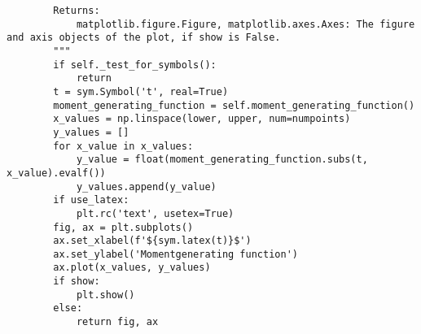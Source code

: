 \begin{small}
\begin{lstlisting}
        Returns:
            matplotlib.figure.Figure, matplotlib.axes.Axes: The figure and axis objects of the plot, if show is False.
        """
        if self._test_for_symbols():
            return
        t = sym.Symbol('t', real=True)
        moment_generating_function = self.moment_generating_function()
        x_values = np.linspace(lower, upper, num=numpoints)
        y_values = []
        for x_value in x_values:
            y_value = float(moment_generating_function.subs(t, x_value).evalf())
            y_values.append(y_value)
        if use_latex:
            plt.rc('text', usetex=True)
        fig, ax = plt.subplots()
        ax.set_xlabel(f'${sym.latex(t)}$')
        ax.set_ylabel('Momentgenerating function')
        ax.plot(x_values, y_values)
        if show:
            plt.show()
        else:
            return fig, ax
\end{lstlisting}
\end{small}